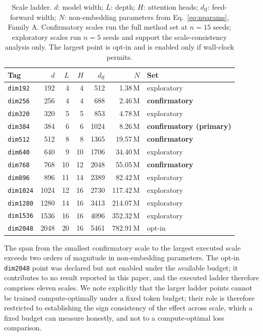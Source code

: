 \documentclass[final,5p,times,twocolumn]{elsarticle}
\theoremstyle{remark}
\begin{document}
\begin{table}[t]
\centering
\small
\caption{Scale ladder. $d$: model width; $L$: depth; $H$: attention heads;
$d_{\mathrm{ff}}$: feed-forward width; $N$: non-embedding parameters from
Eq.~\eqref{eq:nparams}, Family A. Confirmatory scales run the full method set
at $n=15$ seeds; exploratory scales run $n=5$ seeds and support the
scale-consistency analysis only. The largest point is opt-in and is enabled
only if wall-clock permits.}
\label{tab:ladder}
\begin{tabular}{lrrrrrl}
\toprule
Tag & $d$ & $L$ & $H$ & $d_{\mathrm{ff}}$ & $N$ & Set \\
\midrule
\texttt{dim192} & 192 & 4 & 4 & 512 & \phantom{00}1.38\,M & exploratory \\
\texttt{dim256} & 256 & 4 & 4 & 688 & \phantom{00}2.46\,M & \textbf{confirmatory} \\
\texttt{dim320} & 320 & 5 & 5 & 853 & \phantom{00}4.78\,M & exploratory \\
\texttt{dim384} & 384 & 6 & 6 & 1024 & \phantom{00}8.26\,M & \textbf{confirmatory (primary)} \\
\texttt{dim512} & 512 & 8 & 8 & 1365 & \phantom{0}19.57\,M & \textbf{confirmatory} \\
\texttt{dim640} & 640 & 9 & 10 & 1706 & \phantom{0}34.40\,M & exploratory \\
\texttt{dim768} & 768 & 10 & 12 & 2048 & \phantom{0}55.05\,M & \textbf{confirmatory} \\
\texttt{dim896} & 896 & 11 & 14 & 2389 & \phantom{0}82.42\,M & exploratory \\
\texttt{dim1024} & 1024 & 12 & 16 & 2730 & 117.42\,M & exploratory \\
\texttt{dim1280} & 1280 & 14 & 16 & 3413 & 214.07\,M & exploratory \\
\texttt{dim1536} & 1536 & 16 & 16 & 4096 & 352.32\,M & exploratory \\
\midrule
\texttt{dim2048} & 2048 & 20 & 16 & 5461 & 782.91\,M & opt-in \\
\bottomrule
\end{tabular}
\end{table}

The span from the smallest confirmatory scale to the largest executed scale
exceeds two orders of magnitude in non-embedding parameters. The opt-in \texttt{dim2048} point was declared but
not enabled under the available budget; it contributes to no result
reported in this paper, and the executed ladder therefore comprises eleven
scales. We note explicitly that the larger ladder points
cannot be trained compute-optimally under a fixed token budget; their role is
therefore restricted to establishing the sign consistency of the effect
across scale, which a fixed budget can measure honestly, and not to a
compute-optimal loss comparison.
\end{document}

